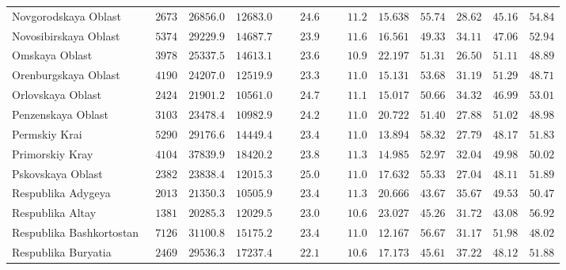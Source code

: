 \documentclass[12pt,a4paper]{article}
\numberwithin{equation}{section}
\begin{document}
{\begin{longtable}{lcccccccccc}
		Novgorodskaya Oblast  & $\phantom{0}2673$ & $26856.0$ & $12683.0$ & $\phantom{000}24.6$ & $\phantom{000}11.2$ & $15.638$ & $55.74$ & $28.62$ & $45.16$ & $54.84$ \\
		Novosibirskaya Oblast  & $\phantom{0}5374$ & $29229.9$ & $14687.7$ & $\phantom{000}23.9$ & $\phantom{000}11.6$ & $16.561$ & $49.33$ & $34.11$ & $47.06$ & $52.94$ \\
		Omskaya Oblast  & $\phantom{0}3978$ & $25337.5$ & $14613.1$ & $\phantom{000}23.6$ & $\phantom{000}10.9$ & $22.197$ & $51.31$ & $26.50$ & $51.11$ & $48.89$ \\
		Orenburgskaya Oblast  & $\phantom{0}4190$ & $24207.0$ & $12519.9$ & $\phantom{000}23.3$ & $\phantom{000}11.0$ & $15.131$ & $53.68$ & $31.19$ & $51.29$ & $48.71$ \\
		Orlovskaya Oblast  & $\phantom{0}2424$ & $21901.2$ & $10561.0$ & $\phantom{000}24.7$ & $\phantom{000}11.1$ & $15.017$ & $50.66$ & $34.32$ & $46.99$ & $53.01$ \\
		Penzenskaya Oblast  & $\phantom{0}3103$ & $23478.4$ & $10982.9$ & $\phantom{000}24.2$ & $\phantom{000}11.0$ & $20.722$ & $51.40$ & $27.88$ & $51.02$ & $48.98$ \\
		Permskiy Krai  & $\phantom{0}5290$ & $29176.6$ & $14449.4$ & $\phantom{000}23.4$ & $\phantom{000}11.0$ & $13.894$ & $58.32$ & $27.79$ & $48.17$ & $51.83$ \\
		Primorskiy Kray  & $\phantom{0}4104$ & $37839.9$ & $18420.2$ & $\phantom{000}23.8$ & $\phantom{000}11.3$ & $14.985$ & $52.97$ & $32.04$ & $49.98$ & $50.02$ \\
		Pskovskaya Oblast  & $\phantom{0}2382$ & $23838.4$ & $12015.3$ & $\phantom{000}25.0$ & $\phantom{000}11.0$ & $17.632$ & $55.33$ & $27.04$ & $48.11$ & $51.89$ \\
		Respublika Adygeya  & $\phantom{0}2013$ & $21350.3$ & $10505.9$ & $\phantom{000}23.4$ & $\phantom{000}11.3$ & $20.666$ & $43.67$ & $35.67$ & $49.53$ & $50.47$ \\
		Respublika Altay  & $\phantom{0}1381$ & $20285.3$ & $12029.5$ & $\phantom{000}23.0$ & $\phantom{000}10.6$ & $23.027$ & $45.26$ & $31.72$ & $43.08$ & $56.92$ \\
		Respublika Bashkortostan  & $\phantom{0}7126$ & $31100.8$ & $15175.2$ & $\phantom{000}23.4$ & $\phantom{000}11.0$ & $12.167$ & $56.67$ & $31.17$ & $51.98$ & $48.02$ \\
		Respublika Buryatia  & $\phantom{0}2469$ & $29536.3$ & $17237.4$ & $\phantom{000}22.1$ & $\phantom{000}10.6$ & $17.173$ & $45.61$ & $37.22$ & $48.12$ & $51.88$ \\

\end{longtable}}
\end{document}
